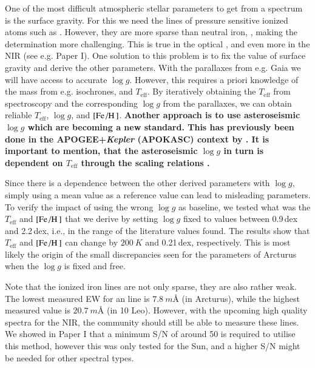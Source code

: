 \documentclass{aa}
\begin{document}
One of the most difficult atmospheric stellar parameters to get from a spectrum
is the surface gravity. For this we need the lines of pressure sensitive ionized
atoms such as . However, they are more sparse than neutral iron,
, making the determination more challenging. This is true in the
optical \citep[see e.g. the discussion by][]{Mortier2013c}, and even more in the
NIR (see e.g. Paper I). One solution to this problem is to fix the value of
surface gravity and derive the other parameters. With the parallaxes from e.g.
Gaia \citep{GAIA} we will have access to accurate $\log g$. However, this
requires a priori knowledge of the mass from e.g. isochrones, and
$T_\mathrm{eff}$. By iteratively obtaining the $T_\mathrm{eff}$ from
spectroscopy and the corresponding $\log g$ from the parallaxes, we can obtain
reliable $T_\mathrm{eff}$, $\log g$, and $[\ion{Fe}/\ion{H}]$. {\bf Another
approach is to use asteroseismic $\log g$ which are becoming a new standard.
This has previously been done in the APOGEE+\emph{Kepler} (APOKASC) context by
\citet{Pinsonneault2014,Hawkins2016}. It is important to mention, that the
asteroseismic $\log g$ in turn is dependent on $T_\mathrm{eff}$ through the
scaling relations \citep[see e.g.][]{Kjeldsen1995}.}

Since there is a dependence between the other derived parameters with $\log g$,
simply using a mean value as a reference value can lead to misleading
parameters. To verify the impact of using the wrong $\log g$ as baseline, we
tested what was the $T_\mathrm{eff}$ and $[\ion{Fe}/\ion{H}]$ that we derive by
setting $\log g$ fixed to values between 0.9\,dex and 2.2\,dex, i.e., in the
range of the literature values found. The results show that $T_\mathrm{eff}$ and
$[\ion{Fe}/\ion{H}]$ can change by $\SI{200}{K}$ and 0.21\,dex, respectively.
This is most likely the origin of the small discrepancies seen for the
parameters of Arcturus when the $\log g$ is fixed and free.

Note that the ionized iron lines are not only sparse, they are also rather weak.
The lowest measured EW for an  line is $\SI{7.8}{m}$\AA{} (in
Arcturus), while the highest measured value is $\SI{20.7}{m}$\AA{} (in 10 Leo).
However, with the upcoming high quality spectra for the NIR, the community
should still be able to measure these  lines. We showed in Paper I
that a minimum S/N of around 50 is required to utilise this method, however this
was only tested for the Sun, and a higher S/N might be needed for other spectral
types.
\end{document}
